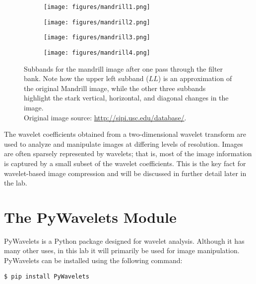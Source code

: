 \begin{figure}[H]
\centering
        \begin{subfigure}{0.4\textwidth}\centering
                    \texttt{[image: figures/mandrill1.png]}
       \end{subfigure}%
        \begin{subfigure}{0.4\textwidth}\centering
                    \texttt{[image: figures/mandrill2.png]}
       \end{subfigure}%
    \hfill
        \begin{subfigure}{0.4\textwidth}\centering
                    \texttt{[image: figures/mandrill3.png]}
       \end{subfigure}%
        \begin{subfigure}{0.4\textwidth}\centering
                    \texttt{[image: figures/mandrill4.png]}
       \end{subfigure}
    \caption{Subbands for the mandrill image after one pass through the filter bank.
    Note how the upper left subband ($LL$) is an approximation of the original Mandrill image, while the other
    three subbands highlight the stark vertical, horizontal, and diagonal changes in the image.\\
    Original image source: \url{http://sipi.usc.edu/database/}.}
    \label{fig:dwt2D}
\end{figure}

The wavelet coefficients obtained from a two-dimensional wavelet transform are used to analyze and manipulate images at differing levels of resolution.
Images are often sparsely represented by wavelets; that is, most of the image information is captured by a small subset of the wavelet coefficients.
This is the key fact for wavelet-based image compression and will be discussed in further detail later in the lab.

\section*{The PyWavelets Module} %

PyWavelets is a Python package designed for wavelet analysis.
Although it has many other uses, in this lab it will primarily be used for image manipulation.
PyWavelets can be installed using the following command:
\begin{lstlisting}
$ pip install PyWavelets
\end{lstlisting}

